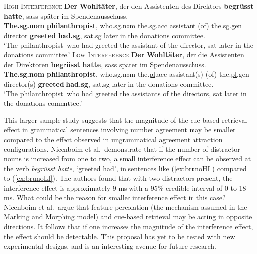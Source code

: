 \documentclass{cambridge7A}\usepackage[]{graphicx}\usepackage[]{color}
\begin{document}
 \begin{exe}
    \ex  \label{ex:brunoexp1}
    \begin{xlist}
        \ex \textsc{High Interference} \label{ex:brunoHI}
        \gll \textbf{Der} \textbf{Wohlt\"ater}, der den Assistenten {} des
        Direktors \textbf{begr\"usst} \textbf{hatte}, sass sp\"ater im
        Spendenausschuss.\\
        \textbf{The.sg.nom} \textbf{philanthropist}, who.sg.nom
        the.\underline{sg}.acc assistant (of) the.\underline{sg}.gen director
        \textbf{greeted} \textbf{had.sg}, sat.sg {later} {in the} {donations
        committee}.\\
        \glt ‘The philanthropist, who had greeted the assistant of the director,
        sat later in the donations committee.'
        \ex \textsc{Low Interference} \label{ex:brunoLI}
        \gll \textbf{Der} \textbf{Wohlt\"ater}, der die Assistenten {} der
        Direktoren  \textbf{begr\"usst} \textbf{hatte}, sass sp\"ater im
        Spendenausschuss.\\
        \textbf{The.sg.nom} \textbf{philanthropist}, who.sg.nom
        the.\underline{pl}.acc assistant(s) (of) the.\underline{pl}.gen
        director(s) \textbf{greeted} \textbf{had.sg}, sat.sg {later} {in the}
        {donations committee}.\\
        \glt ‘The philanthropist, who had greeted the assistants of the
        directors, sat later in the donations committee.'
    \end{xlist}
\end{exe}

This larger-sample study suggests that the magnitude of the  cue-based retrieval effect in  grammatical sentences involving number agreement may be smaller compared to the effect observed in ungrammatical agreement attraction configurations.  Nicenboim et al.\ demonstrate that if the number of distractor  nouns is increased from one to two, a small interference effect can be observed at the verb \textit{begr\"usst hatte}, `greeted had', in  sentences like (\ref{ex:brunoHI})  compared to (\ref{ex:brunoLI}). The authors found that with two distractors present, the interference effect is approximately 9 ms with a 95\% credible interval of 0 to 18 ms. What could be the reason for smaller interference effect in this case?  Nicenboim et al.\ argue that feature percolation (the mechanism assumed in the Marking and Morphing model) and cue-based retrieval may be acting in opposite directions. It follows that if one increases the magnitude of the interference effect, the effect should be detectable. This  proposal has yet to be  tested with new experimental designs, and is an interesting avenue for future research.
  
\end{document}
